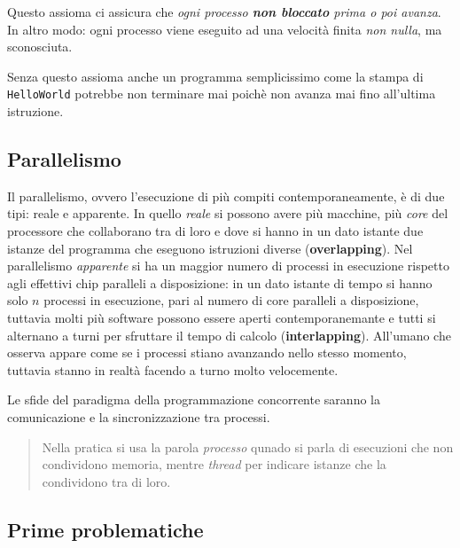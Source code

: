 \documentclass{article}
\begin{document}
Questo assioma ci assicura che \emph{ogni processo \textbf{non bloccato} prima o poi avanza}.
In altro modo: ogni processo viene eseguito ad una velocit\`a finita \emph{non nulla},
ma sconosciuta.

Senza questo assioma anche un programma semplicissimo come la
stampa di \verb!HelloWorld! potrebbe non terminare mai poich\`e non avanza
mai fino all'ultima istruzione.

\subsection{Parallelismo}

Il parallelismo, ovvero l'esecuzione di pi\`u compiti contemporaneamente, \`e di due tipi:
reale e apparente. In quello \emph{reale} si possono avere pi\`u macchine, pi\`u \emph{core} del
processore che collaborano tra di loro e dove si hanno in un dato istante due istanze del
programma che eseguono istruzioni diverse (\textbf{overlapping}). Nel parallelismo \emph{apparente} si ha un maggior
numero di processi in esecuzione rispetto agli effettivi chip paralleli a disposizione:
in un dato istante di tempo si hanno solo $n$ processi in esecuzione, pari al numero di core
paralleli a disposizione, tuttavia molti pi\`u software possono essere aperti contemporanemante
e tutti si alternano a turni per sfruttare il tempo di calcolo (\textbf{interlapping}). All'umano che osserva appare
come se i processi stiano avanzando nello stesso momento, tuttavia stanno in realt\`a facendo
a turno molto velocemente.

Le sfide del paradigma della programmazione concorrente saranno la comunicazione
e la sincronizzazione tra processi.

\begin{quote}
  Nella pratica si usa la parola \emph{processo} qunado si parla di esecuzioni
  che non condividono memoria, mentre \emph{thread} per indicare istanze che
  la condividono tra di loro.
\end{quote}

\subsection{Prime problematiche}
\end{document}
